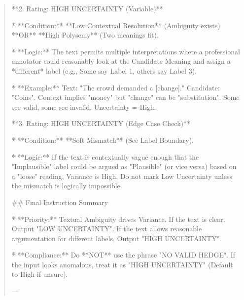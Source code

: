 \begin{quote}
**2. Rating: HIGH UNCERTAINTY (Variable)**

*   **Condition:** **Low Contextual Resolution** (Ambiguity exists) **OR** **High Polysemy** (Two meanings fit).

*   **Logic:** The text permits multiple interpretations where a professional annotator could reasonably look at the Candidate Meaning and assign a *different* label (e.g., Some say Label 1, others say Label 3).

*   **Example:** Text: "The crowd demanded a [change]." Candidate: "Coins". Context implies "money" but "change" can be "substitution". Some see valid, some see invalid. Uncertainty = High.



**3. Rating: HIGH UNCERTAINTY (Edge Case Check)**

*   **Condition:** **Soft Mismatch** (See Label Boundary).

*   **Logic:** If the text is contextually vague enough that the "Implausible" label could be argued as "Plausible" (or vice versa) based on a "loose" reading, Variance is High. Do not mark Low Uncertainty unless the mismatch is logically impossible.



## Final Instruction Summary

*   **Priority:** Textual Ambiguity drives Variance. If the text is clear, Output "LOW UNCERTAINTY". If the text allows reasonable argumentation for different labels, Output "HIGH UNCERTAINTY".

*   **Compliance:** Do **NOT** use the phrase "NO VALID HEDGE". If the input looks anomalous, treat it as "HIGH UNCERTAINTY" (Default to High if unsure).

---
\end{quote}
